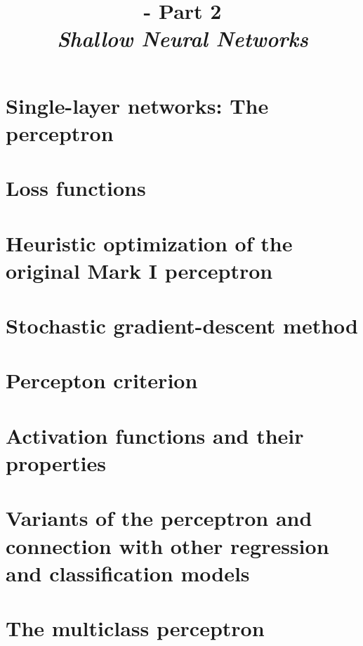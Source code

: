\renewcommand{\prevlecture}{1 }
\renewcommand{\thislecture}{2 }
\renewcommand{\nextlecture}{3 }

%
%

\title[\modulename - Part \thislecture]
{
  {\bf 
   \modulename - 
   Part \thislecture\\
  }
  \vspace{0.5cm}
  {\it 
   \color{yellow}
    Shallow Neural Networks\\
  }
}



\begin{frame}[plain]
  \titlepage
\end{frame}




\section{Single-layer networks: The perceptron}
\section{Loss functions}
\section{Heuristic optimization of the original Mark I perceptron}
\section{Stochastic gradient-descent method}
\section{Percepton criterion}
\section{Activation functions and their properties}
\section{Variants of the perceptron and connection with other regression and classification models}
\section{The multiclass perceptron}
